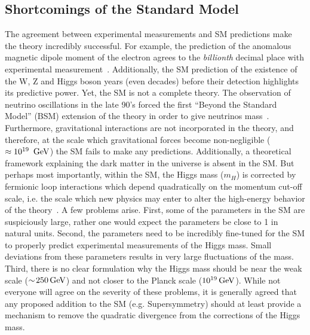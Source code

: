 \subsection{Shortcomings of the Standard Model}
The agreement between experimental measurements and SM predictions make
the theory incredibly successful. For example, the prediction of the anomalous magnetic dipole 
moment of the electron agrees to the \textit{billionth} decimal place with experimental 
measurement~\cite{PhysRevLett.97.030801}. Additionally, the SM prediction of the existence of the W, Z and Higgs boson
years (even decades) before their detection highlights its predictive power. Yet, the SM is not 
a complete theory. The observation of neutrino oscillations in the late 90's forced the first 
``Beyond the Standard Model'' (BSM) extension of the theory in order to give neutrinos 
mass~\cite{zuber2003neutrino}. Furthermore, gravitational interactions are not incorporated in the theory,
and therefore, at the scale which gravitational forces become non-negligible 
($\approx 10^{19}~\,\text{Ge\hspace{-.08em}V}$) the SM fails to make any predictions. Additionally, a theoretical 
framework explaining the dark matter in the universe is absent in the SM.
But perhaps most importantly, within the SM, the Higgs mass ($m_{H}$) is corrected by fermionic
loop interactions which depend quadratically on the momentum cut-off scale, i.e. the scale 
which new physics may enter to alter the high-energy behavior of the theory~\cite{Martin:1997ns}.
A few problems arise. First, some of the parameters in the SM are suspiciously large, rather one 
would expect the parameters be close to 1 in natural units. Second, the parameters
need to be incredibly fine-tuned for the SM to properly predict experimental measurements of the
Higgs mass. Small deviations from these parameters results in very large fluctuations of the mass. 
Third, there is no clear formulation why the Higgs mass should be near the weak scale ($\sim\!250\,\text{Ge\hspace{-.08em}V}$) 
and not closer to the Planck scale ($10^{19}\,\text{Ge\hspace{-.08em}V}$). While not everyone will agree on the 
severity of these problems, it is generally agreed that any proposed addition to the SM 
(e.g. Supersymmetry) should at least provide a mechanism to remove the quadratic divergence from the corrections of 
the Higgs mass.

